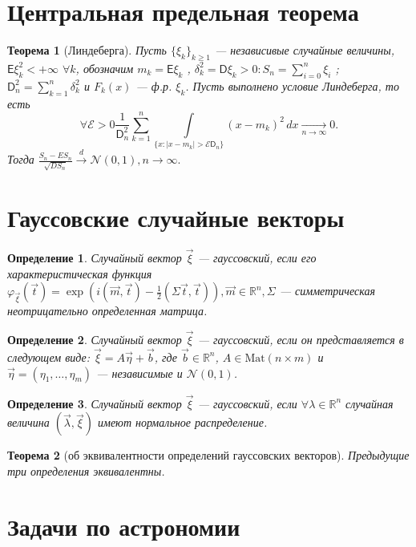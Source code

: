 \documentclass[11pt]{article}
\begin{document}
\newtheorem{definition}{Определение}
\newtheorem{thm}{Теорема}[section]
\newenvironment{problem}[1]{}{}
	\section{Центральная предельная теорема}
	\begin{thm}[Линдеберга]
	Пусть $\{\xi_k\}_{k\geq1}$ --- независивые случайные величины, $\mathsf{E}\xi_k^2<+\infty$ $\forall k$, обозначим $m_k = \mathsf{E}\xi_k$ , $\delta_k^2 = \mathsf{D}\xi_k > 0 : S_n = \sum\limits_{i = 0}^n \xi_i $ ; $\mathsf{D}_n^2 = \sum\limits_{k = 1}^n \delta_k^2$ и $F_k(x)$ --- ф.р. $\xi_k$. Пусть выполнено условие Линдеберга, то есть
  	$$\forall\mathcal{E}>0 \frac{1}{\mathsf{D}_n^2} \sum  \limits_{k = 1}^n \int \limits_{\{x:|x-m_k|>\mathcal{E} \mathsf{D}_n\}} (x-m_k)^2 \, dx \xrightarrow[n\rightarrow\infty]{}0.$$ 
  	Тогда $\frac{S_n-ES_n}{\sqrt{DS_n}}\xrightarrow{d} \mathcal{N}(0,1), n\rightarrow\infty.$
	\end{thm}
	\section{Гауссовские случайные векторы}
	\begin{definition}
	Случайный вектор $\vec{\xi}$ --- гауссовский, если его характеристическая функция 
	$\varphi_{\vec{\xi}} (\vec{t}) = \exp(i(\vec{m}, \vec{t}) - \frac{1}{2}(\Sigma \vec{t},\vec{t})), \vec{m}\in\mathbb{R}^n, \Sigma$ --- симметрическая неотрицательно определенная матрица.
	\end{definition}

	\begin{definition}
	Случайный вектор $\vec{\xi}$ --- гауссовский, если он представляется в следующем виде: 
	$\vec{\xi} = A\vec{\eta} + \vec{b}$, где $\vec{b} \in \mathbb{R}^n$, $A\in \text{Mat}(n\times m)$ и $\vec{\eta} = (\eta_1, \dots , \eta_m)$ --- независимые и $\mathcal{N}(0,1)$.
	\end{definition}
	
	\begin{definition}
	Случайный вектор $\vec{\xi}$ --- гауссовский, если $\forall\lambda\in\mathbb{R}^n$ случайная величина $(\vec{\lambda},\vec{\xi})$ имеют нормальное распределение.
	\end{definition}
	
	\begin{thm}[об эквивалентности определений гауссовских векторов]
	Предыдущие три определения эквивалентны.
	\end{thm}
    \section{Задачи по астрономии}
\end{document}
